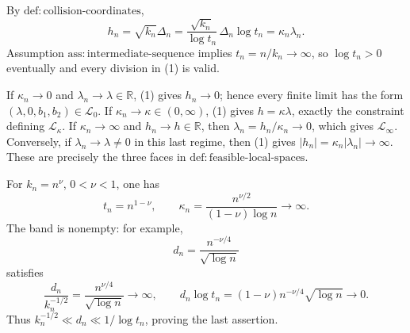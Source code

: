 By \(\mathrm{def{:}collision\text{-}coordinates}\),
\[
 h_n=\sqrt{k_n}\Delta_n
 =\frac{\sqrt{k_n}}{\log t_n}\,\Delta_n\log t_n
 =\kappa_n\lambda_n. \tag{1}
\]
Assumption \(\mathrm{ass{:}intermediate\text{-}sequence}\) implies \(t_n=n/k_n\to\infty\), so \(\log t_n>0\) eventually and every division in (1) is valid.

If \(\kappa_n\to0\) and \(\lambda_n\to\lambda\in\mathbb R\), (1) gives \(h_n\to0\); hence every finite limit has the form \((\lambda,0,b_1,b_2)\in\mathcal L_0\).  If \(\kappa_n\to\kappa\in(0,\infty)\), (1) gives \(h=\kappa\lambda\), exactly the constraint defining \(\mathcal L_\kappa\).  If \(\kappa_n\to\infty\) and \(h_n\to h\in\mathbb R\), then \(\lambda_n=h_n/\kappa_n\to0\), which gives \(\mathcal L_\infty\).  Conversely, if \(\lambda_n\to\lambda\neq0\) in this last regime, then (1) gives \(|h_n|=\kappa_n|\lambda_n|\to\infty\).  These are precisely the three faces in \(\mathrm{def{:}feasible\text{-}local\text{-}spaces}\).

For \(k_n=n^\nu\), \(0<\nu<1\), one has
\[
 t_n=n^{1-\nu},\qquad
 \kappa_n=\frac{n^{\nu/2}}{(1-\nu)\log n}\longrightarrow\infty.
\]
The band is nonempty: for example,
\[
 d_n=\frac{n^{-\nu/4}}{\sqrt{\log n}}
\]
satisfies
\[
 \frac{d_n}{k_n^{-1/2}}
 =\frac{n^{\nu/4}}{\sqrt{\log n}}\longrightarrow\infty,
 \qquad
 d_n\log t_n
 =(1-\nu)n^{-\nu/4}\sqrt{\log n}\longrightarrow0.
\]
Thus \(k_n^{-1/2}\ll d_n\ll1/\log t_n\), proving the last assertion.